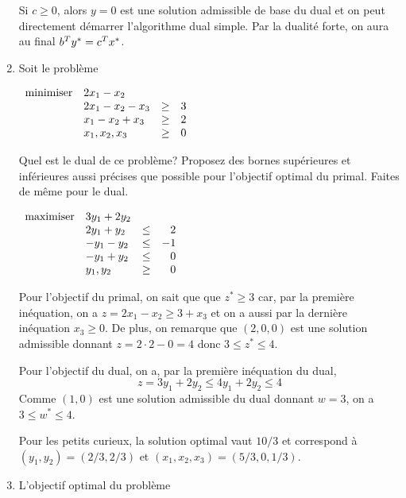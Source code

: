 \begin{enumerate}
\begin{solution}
      Si $c \geq 0$, alors $y=0$ est une solution admissible de base du dual et on peut directement démarrer l'algorithme dual simple. Par la dualité forte, on aura au final $b^{T}y^{*} = c^{T}x^*$.
    \end{solution}

  \item Soit le problème

    $
    \begin{array}{llcr}
      \mbox{minimiser} & 2x_1-x_2\\
      & 2x_1-x_2 -x_3 & \geq & 3\\
      & x_1-x_2 +x_3 & \geq & 2\\
      & x_1, x_2, x_3 & \geq & 0
    \end{array}
    $

    Quel est le dual de ce problème?
    Proposez des bornes supérieures et inférieures aussi précises que possible pour l'objectif optimal du primal.
    Faites de même pour le dual.

    \begin{solution}

      $
      \begin{array}{llcr}
        \mbox{maximiser} & 3y_1 + 2y_2\\
        & 2y_1 + y_2 & \leq & 2\\
        & -y_1 - y_2 & \leq & -1\\
        & -y_1 + y_2 & \leq & 0\\
        & y_1, y_2 & \geq & 0
      \end{array}
      $

      Pour l'objectif du primal, on sait que que $z^* \geq 3$ car,
      par la première inéquation, on a $z = 2x_1 - x_2 \geq 3 + x_3$ et on
      a aussi par la dernière inéquation $x_3 \geq 0$.
      De plus, on remarque que $(2, 0, 0)$ est une solution admissible donnant
      $z = 2\cdot 2 - 0 = 4$ donc $3 \leq z^* \leq 4$.

      Pour l'objectif du dual, on a, par la première inéquation du dual,
      $$ z = 3y_1 + 2y_2 \leq 4y_1 + 2y_2 \leq 4 $$
      Comme $(1, 0)$ est une solution admissible du dual donnant $w = 3$,
      on a $3 \leq w^* \leq 4$.

      Pour les petits curieux, la solution optimal vaut $10/3$ et correspond
      à $(y_1, y_2) = (2/3, 2/3)$ et $(x_1, x_2, x_3) = (5/3, 0, 1/3)$.
    \end{solution}

  \item L'objectif optimal du problème


\end{enumerate}
